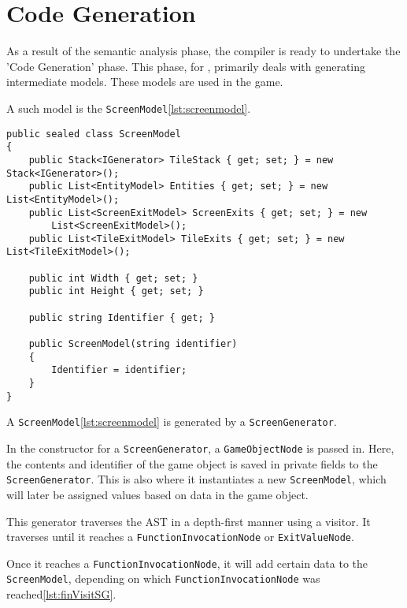 \section{Code Generation} \label{sec:code_generation}
As a result of the semantic analysis phase, the \dazel{} compiler is ready to undertake the 'Code Generation' phase.
This phase, for \dazel{}, primarily deals with generating intermediate models. These models are used in the \dazel{} game.

A such model is the \texttt{ScreenModel}\ref{lst:screenmodel}.

\begin{lstlisting}[language=CSharp, label={lst:screenmodel}, caption={The \textbf{ScreenModel} class.}]
public sealed class ScreenModel
{
    public Stack<IGenerator> TileStack { get; set; } = new Stack<IGenerator>();
    public List<EntityModel> Entities { get; set; } = new List<EntityModel>();
    public List<ScreenExitModel> ScreenExits { get; set; } = new 
        List<ScreenExitModel>();
    public List<TileExitModel> TileExits { get; set; } = new List<TileExitModel>();

    public int Width { get; set; }
    public int Height { get; set; }
    
    public string Identifier { get; }

    public ScreenModel(string identifier)
    {
        Identifier = identifier;
    }
}
\end{lstlisting}

A \texttt{ScreenModel}\ref{lst:screenmodel} is generated by a \texttt{ScreenGenerator}.

In the constructor for a \texttt{ScreenGenerator}, a \texttt{GameObjectNode} is passed in. Here, the contents and identifier of the game object is saved in private fields to the \texttt{ScreenGenerator}. This is also where it instantiates a new \texttt{ScreenModel}, which will later be assigned values based on data in the game object.  

This generator traverses the AST in a depth-first manner using a visitor. It traverses until it reaches a \texttt{FunctionInvocationNode} or \texttt{ExitValueNode}.

Once it reaches a \texttt{FunctionInvocationNode}, it will add certain data to the \texttt{ScreenModel}, depending on which \texttt{FunctionInvocationNode} was reached\ref{lst:finVisitSG}.

